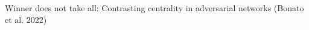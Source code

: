 \documentclass[preview]{standalone}
\begin{document}
Winner does not take all: Contrasting centrality in adversarial networks (Bonato et al. 2022)\\
\end{document}
